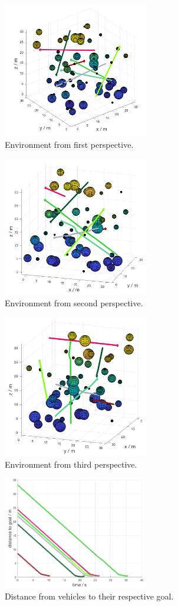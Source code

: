 \documentclass[journal, twoside]{IEEEtran}
\begin{document}
	\begin{figure}[h]
			\centering
			\includegraphics[width=2.5in]{Results/Potentialfields/env_1}
			\caption{Environment from first perspective.}
			\label{fig:env_1}
		\end{figure}	
		\begin{figure}[h]
			\centering
			\includegraphics[width=2.5in]{Results/Potentialfields/env_2}
			\caption{Environment from second perspective.}
			\label{fig:env_2}
		\end{figure}	
		\begin{figure}[h]
			\centering
			\includegraphics[width=2.5in]{Results/Potentialfields/env_3}
			\caption{Environment from third perspective.}
			\label{fig:env_3}
		\end{figure}	
		\begin{figure}[h]
			\centering
			\includegraphics[width=2.5in]{Results/Potentialfields/goal}
			\caption{Distance from vehicles to their respective goal.}
			\label{fig:goal}
		\end{figure}
\end{document}
